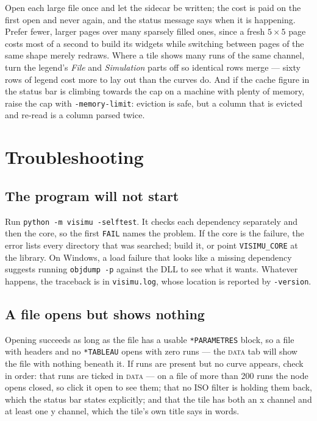 \documentclass[11pt,a4paper,oneside]{report}
\newcommand{\code}[1]{\texttt{#1}}
\newcommand{\tab}[1]{\textsc{#1}}
\begin{document}
Open each large file once and let the sidecar be written; the cost is paid on
the first open and never again, and the status message says when it is
happening. Prefer fewer, larger pages over many sparsely filled ones, since a
fresh $5 \times 5$ page costs most of a second to build its widgets while
switching between pages of the same shape merely redraws. Where a tile shows
many runs of the same channel, turn the legend's \emph{File} and
\emph{Simulation} parts off so identical rows merge --- sixty rows of legend
cost more to lay out than the curves do. And if the cache figure in the status
bar is climbing towards the cap on a machine with plenty of memory, raise the
cap with \code{-memory-limit}: eviction is safe, but a column that is evicted
and re-read is a column parsed twice.

\section{Troubleshooting}

\subsection{The program will not start}

Run \code{python -m visimu -selftest}. It checks each dependency separately
and then the core, so the first \code{FAIL} names the problem. If the core is
the failure, the error lists every directory that was searched; build it, or
point \code{VISIMU\_CORE} at the library. On Windows, a load failure that
looks like a missing dependency suggests running \code{objdump -p} against the
DLL to see what it wants. Whatever happens, the traceback is in
\code{visimu.log}, whose location is reported by \code{-version}.

\subsection{A file opens but shows nothing}

Opening succeeds as long as the file has a usable \code{*PARAMETRES} block, so a
file with headers and no \code{*TABLEAU} opens with zero runs --- the
\tab{data} tab will show the file with nothing beneath it. If runs are present
but no curve appears, check in order: that runs are ticked in \tab{data} --- on
a file of more than 200 runs the node opens closed, so click it open to see
them; that no ISO filter is holding them back, which the status bar states
explicitly; and that the tile has both an x channel and at least one y channel,
which the tile's own title says in words.
\end{document}
